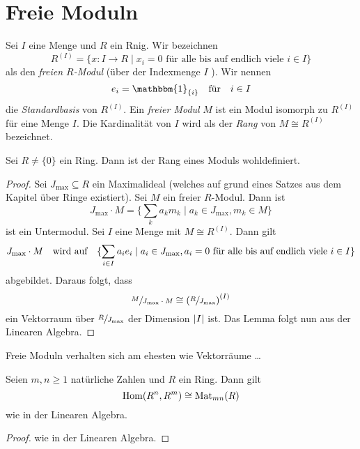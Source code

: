\section{Freie Moduln}

\begin{definition}
	Sei $I$ eine Menge und $R$ ein Rnig. Wir bezeichnen
	\[
		R^{(I)} = \{x : I \to R \mid x_{i} = 0 \text{ für alle bis auf endlich viele } i \in I\} 
	\] 
	als den \emph{freien $R$-Modul} (über der Indexmenge $I$ ). Wir nennen
	\[
		e_{i} = \mathbbm{1}_{\{i\}} \qq{für} i \in I
	\]
	die \emph{Standardbasis} von $R^{(I)}$.
	Ein \emph{freier Modul} $M$ ist ein Modul isomorph zu $R^{(I)}$ für eine Menge $I$.
	Die Kardinalität von $I$ wird als der \emph{Rang} von $M \cong R^{(I)}$ bezeichnet.
\end{definition}

\begin{lemma}
	Sei $R \neq \{0\} $ ein Ring. Dann ist der Rang eines Moduls wohldefiniert.
\end{lemma}

\begin{proof}
	Sei $J_{\max} \subseteq R$ ein Maximalideal (welches auf grund eines Satzes aus dem Kapitel über Ringe existiert).
	Sei $M$ ein freier $R$-Modul. Dann ist
	\[
	J_{\max} \cdot M = \{\sum_{k} a_{k} m_{k} \mid a_{k} \in J_{\max}, m_{k} \in M\} 
	\] 
	ist ein Untermodul. Sei $I$ eine Menge mit  $M \cong R^{(I)}$. Dann gilt  
	\[
		J_{\max} \cdot M \qq{wird auf} \{\sum_{i \in I} a_{i} e_{i} \mid a_{i} \in J_{\max}, a_{i} = 0 \text{ für alle bis auf endlich viele } i \in I\}
	\]
	abgebildet. Daraus folgt, dass
	\[
		\sfrac{M}{J_{\max} \cdot M} \cong \left( \sfrac{R}{J_{\max}} \right)^{(I)}
	\] 
	ein Vektorraum über $\sfrac{R}{J_{\max}}$ der Dimension $\abs{I}$ ist. 
	Das Lemma folgt nun aus der Linearen Algebra.
\end{proof}

\begin{claim}
	Freie Moduln verhalten sich am ehesten wie Vektorräume \ldots
\end{claim}

\begin{proposition}
	Seien $m,n \geq 1$ natürliche Zahlen und $R$ ein Ring. Dann gilt
	\[
		\operatorname{Hom}(R^{n},R^{m}) \cong \operatorname{Mat}_{mn}(R)
	\] 
	wie in der Linearen Algebra.
\end{proposition}

\begin{proof}
	wie in der Linearen Algebra.
\end{proof}

